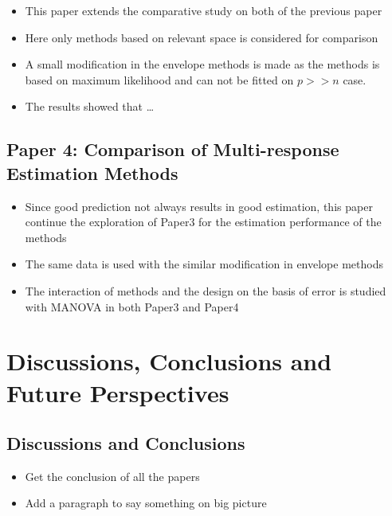 \documentclass[11pt,twoside,openright,titlepage,
  headinclude,footinclude,BCOR=5mm,
  numbers=noenddot,cleardoublepage=empty,
  tablecaptionabove, dottedtoc,
  bibliography=totoc]{scrreprt}
\providecommand{\tightlist}{%
  \setlength{\itemsep}{0pt}\setlength{\parskip}{0pt}}
\begin{document}
\begin{itemize}
\tightlist
\item
  This paper extends the comparative study on both of the previous paper
\item
  Here only methods based on relevant space is considered for comparison
\item
  A small modification in the envelope methods is made as the methods is based on maximum likelihood and can not be fitted on \(p>>n\) case.
\item
  The results showed that \ldots{}
\end{itemize}

\hypertarget{paper-4-comparison-of-multi-response-estimation-methods}{%
\section{Paper 4: Comparison of Multi-response Estimation Methods}\label{paper-4-comparison-of-multi-response-estimation-methods}}

\begin{itemize}
\tightlist
\item
  Since good prediction not always results in good estimation, this paper continue the exploration of Paper3 for the estimation performance of the methods
\item
  The same data is used with the similar modification in envelope methods
\item
  The interaction of methods and the design on the basis of error is studied with MANOVA in both Paper3 and Paper4
\end{itemize}

\hypertarget{discussions-conclusions-and-future-perspectives}{%
\chapter{Discussions, Conclusions and Future Perspectives}\label{discussions-conclusions-and-future-perspectives}}

\hypertarget{discussions-and-conclusions}{%
\section{Discussions and Conclusions}\label{discussions-and-conclusions}}

\begin{itemize}
\tightlist
\item
  Get the conclusion of all the papers
\item
  Add a paragraph to say something on big picture
\end{itemize}
\end{document}
